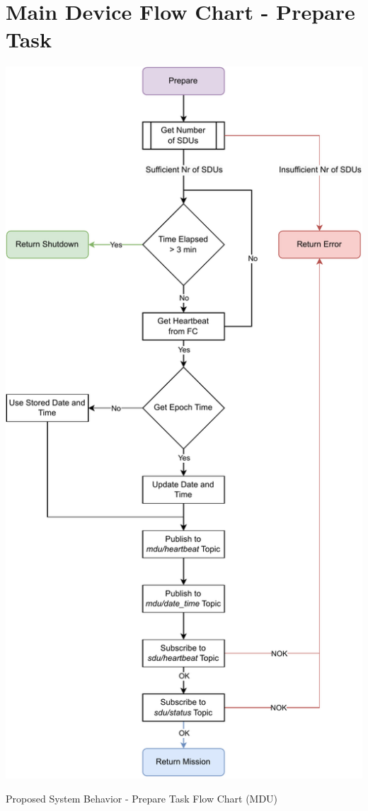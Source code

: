 
\chapter{Main Device Flow Chart - Prepare Task} %

\label{AppendixA}

\begin{algorithm}[H]
    \centering
    \includegraphics[scale=0.6]{appendices/assets/MDU_PREPARE.pdf}
    \caption{Proposed System Behavior - Prepare Task Flow Chart (MDU)}
    \label{alg:MDU_PREPARE}
\end{algorithm}

